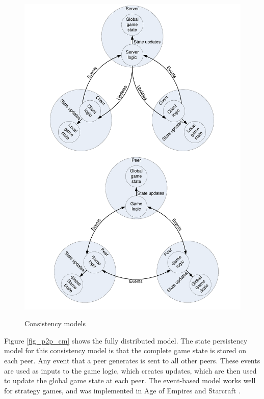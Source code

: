 \documentclass[10pt,a4paper,journal,cspaper,compsoc]{IEEEtran}
\begin{document}
\begin{figure}[htbp]
{\includegraphics[clip=true, viewport= 2.5cm 15cm 19cm 30cm, width=\columnwidth]{CS_P2P_CMs}}
\caption{Consistency models}
\end{figure}
%
Figure \ref{fig_p2p_cm} shows the fully distributed model. The state persistency model for this consistency model is that the complete game state is
stored on each peer. Any event that a peer generates is sent to all other peers. These events are used as inputs to the game logic, which creates
updates, which are then used to update the global game state at each peer. The event-based model works well for strategy games, and was implemented
in Age of Empires \cite{p2p_cm_aoe} and Starcraft \cite{starcraft_network_model}.
\end{document}
